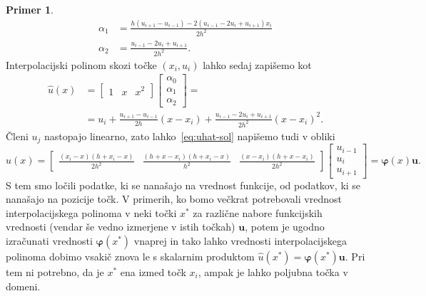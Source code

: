 \documentclass[12pt,a4paper,twoside]{article}
\theoremstyle{definition} %
\newtheorem{primer}[definicija]{Primer}
\theoremstyle{plain} %
\numberwithin{equation}{section}
\renewcommand{\b}{\boldsymbol}
\renewcommand{\phi}{\varphi}
\begin{document}
\begin{primer}
\begin{align}
  \alpha_1 &= \frac{h (u_{i+1}-u_{i-1})-2 (u_{i-1}-2 u_{i}+u_{i+1}) x_i}{2 h^2} \\
  \alpha_2 &= \frac{u_{i-1}-2 u_{i}+u_{i+1}}{2 h^2}.
\end{align}
Interpolacijski polinom skozi točke $(x_i, u_i)$ lahko sedaj zapišemo kot
\begin{align}
  \hat{u}(x) &=
  \begin{bmatrix}
    1 & x & x^2
  \end{bmatrix}
  \begin{bmatrix}
    \alpha_0 \\ \alpha_1 \\ \alpha_2
  \end{bmatrix} = \nonumber \\
  &= u_i +\frac{u_{i+1}-u_{i-1}}{2 h}(x-x_i)+\frac{u_{i-1}-2 u_{i}+u_{i+1}}{2
  h^2}(x-x_i)^2. \label{eq:uhat-sol}
\end{align}
Členi $u_j$ nastopajo linearno, zato lahko~\eqref{eq:uhat-sol} napišemo tudi v obliki
\begin{equation}
  \hat{u}(x) =
  \begin{bmatrix}
  \frac{(x_i-x) (h+x_i-x)}{2 h^2} & \frac{(h+x-x_i)(h+x_i-x)}{h^2} & \frac{(x-x_i) (h+x-x_i)}{2 h^2}
  \end{bmatrix}
  \begin{bmatrix}
    u_{i-1} \\ u_{i} \\ u_{i+1}
  \end{bmatrix}= \b\phi(x)\b u.
\end{equation}
S tem smo ločili podatke, ki se nanašajo na vrednost funkcije, od podatkov, ki se nanašajo na
pozicije točk. V primerih, ko bomo večkrat potrebovali vrednost interpolacijskega polinoma v
neki točki $x^\ast$ za različne nabore funkcijskih vrednosti (vendar še vedno izmerjene v istih
točkah) $\b u$, potem je ugodno izračunati vrednosti $\b\phi(x^\ast)$ vnaprej in tako lahko
vrednosti interpolacijskega polinoma dobimo vsakič znova le s skalarnim produktom $\hat u(x^\ast) =
\b\phi(x^\ast) \b u$. Pri tem ni potrebno, da je $x^\ast$ ena izmed točk $x_i$, ampak je lahko
poljubna točka v domeni.


\end{primer}
\end{document}
